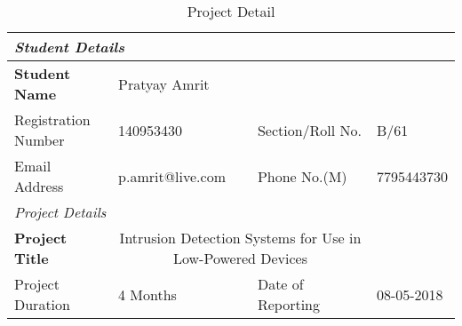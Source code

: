 
\begin{table}
\begin{scriptsize}
\caption{Project Detail}
\begin{tabularx}{\textwidth}{|X|X|X|X|}
\multicolumn{4}{l}{\textit{Student Details}}\\
\hline
\textbf{Student Name}&\multicolumn{2}{X}{Pratyay Amrit}&\\ \hline
Registration Number&140953430&Section/Roll No.& B/61\\ \hline
Email Address&\tiny{p.amrit@live.com}&Phone No.(M)&7795443730 \\  \hline
\multicolumn{4}{l}{\textit{Project Details}}\\ \hline
\textbf{Project Title}&\multicolumn{2}{c}{\tiny{Intrusion Detection Systems for Use in Low-Powered Devices}}& \\ \hline
Project Duration& 4 Months&Date of Reporting& 08-05-2018 \\ \hline

\end{tabularx}
\end{scriptsize}
\end{table}
